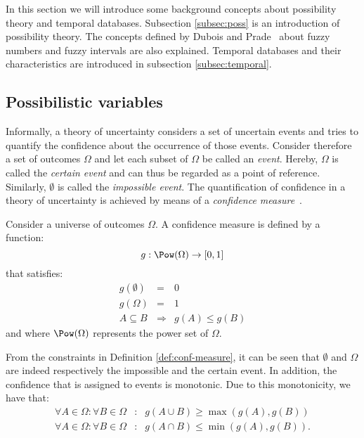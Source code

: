 %
%

In this section we will introduce some background concepts about possibility theory and temporal databases. Subsection \ref{subsec:poss} is an introduction of possibility theory. The concepts defined by Dubois and Prade~\cite{Dubois1983} about fuzzy numbers and fuzzy intervals are also explained. Temporal databases and their characteristics are introduced in subsection \ref{subsec:temporal}.




\subsection{\label{subsec:poss}Possibilistic variables}
Informally, a theory of uncertainty considers a set of uncertain events and tries to quantify the confidence about the occurrence of those events. Consider therefore a set of outcomes $\Omega$ and let each subset of $\Omega$ be called an \emph{event}. Hereby, $\Omega$ is called the \emph{certain event} and can thus be regarded as a point of reference. Similarly, $\emptyset$ is called the \emph{impossible event}. The quantification of confidence in a theory of uncertainty is achieved by means of a \emph{confidence measure}~\cite{Choquet53}.
\begin{definition}
\label{def:conf-measure}
Consider a universe of outcomes $\Omega$. A confidence measure is defined by a function:
\begin{equation}
g:\Pow(\Omega)\rightarrow[0,1]
\end{equation}
that satisfies:
\begin{eqnarray}
g\left(\emptyset\right)&=&0\\
g\left(\Omega\right)&=&1\\
A\subseteq B&\Rightarrow&g(A)\leq g(B)
\end{eqnarray}
and where $\Pow(\Omega)$ represents the power set of $\Omega$.
\end{definition}
From the constraints in Definition \ref{def:conf-measure}, it can be seen that $\emptyset$ and $\Omega$ are indeed respectively the impossible and the certain event. In addition, the confidence that is assigned to events is monotonic. Due to this monotonicity, we have that:
\begin{eqnarray}
\forall A\in\Omega:\forall B\in\Omega&:&g\left(A\cup B\right)\geq\max\left(g\left(A\right),g\left(B\right)\right)\\
\forall A\in\Omega:\forall B\in\Omega&:&g\left(A\cap B\right)\leq\min\left(g\left(A\right),g\left(B\right)\right).
\end{eqnarray}

